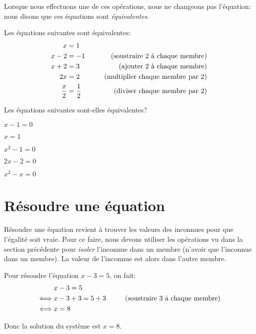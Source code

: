 Lorsque nous effectuons une de ces opérations, nous ne changeons pas l'équation: nous disons que ces équations sont \emph{équivalentes}.

\begin{exemple}
    Les équations suivantes sont équivalentes:
    \begin{alignat*}{3}
        x & = 1 &\\
        x - 2 & = -1& \text{  (soustraire 2 à chaque membre)}\\
        x + 2 & = 3& \text{ (ajouter 2 à chaque membre)}\\
        2x & = 2& \hspace{5mm}\text{ (multiplier chaque membre par 2)}\\
        \frac{x}2 & = \frac12& \text{ (diviser chaque membre par 2)}\\
    \end{alignat*}
\end{exemple}

\begin{exercice}
    Les équations suivantes sont-elles équivalentes?
    \begin{exerciceenumnoeq}
        \item $x - 1 = 0$
        \item $x = 1$
        \item $x^2 - 1 = 0$
        \item $2x - 2 = 0$
        \item $x^2 - x = 0$
    \end{exerciceenumnoeq}
\end{exercice}


\section{Résoudre une équation}

Résoudre une équation revient à trouver les valeurs des inconnues pour que l'égalité soit vraie. Pour ce faire, nous devons utiliser les opérations vu dans la section précédente pour \emph{isoler} l'inconnue dans un membre (n'avoir que l'inconnue dans un membre). La valeur de l'inconnue est alors dans l'autre membre.

\begin{exemple}
    Pour résoudre l'équation $x - 3 = 5$, on fait:
    \begin{alignat*}{3}
        & x - 3 = 5&\\
        \iff & x - 3 + 3 = 5 + 3 & \hspace{5mm} \text{ (soustraire 3 à chaque membre)}\\
        \iff & x = 8 &
    \end{alignat*}

    Donc la solution du système est $x = 8$.
\end{exemple}

